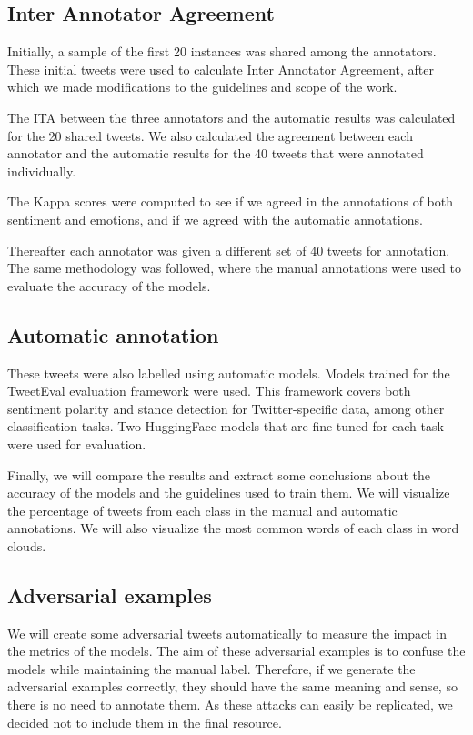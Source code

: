 \documentclass[11pt,a4paper]{article}
\begin{document}
\subsection{Inter Annotator Agreement}

Initially, a sample of the first 20 instances was shared among the annotators. These initial tweets were used to calculate Inter Annotator Agreement, after which we made modifications to the guidelines and scope of the work. 

The ITA between the three annotators and the automatic results was calculated for the 20 shared tweets. We also calculated the agreement between each annotator and the automatic results for the 40 tweets that were annotated individually.

The Kappa scores were computed to see if we agreed in the annotations of both sentiment and emotions, and if we agreed with the automatic annotations.

Thereafter each annotator was given a different set of 40 tweets for annotation. The same methodology was followed, where the manual annotations were used to evaluate the accuracy of the models.

\subsection{Automatic annotation}

These tweets were also labelled using automatic models. Models trained for the TweetEval \cite{barbieri-etal-2020-tweeteval} evaluation framework were used. This framework covers both sentiment polarity and stance detection for Twitter-specific data, among other classification tasks. Two HuggingFace models that are fine-tuned for each task were used for evaluation.

Finally, we will compare the results and extract some conclusions about the accuracy of the models and the guidelines used to train them. We will visualize the percentage of tweets from each class in the manual and automatic annotations. We will also visualize the most common words of each class in word clouds.

\subsection{Adversarial examples}

We will create some adversarial tweets automatically to measure the impact in the metrics of the models. The aim of these adversarial examples is to confuse the models while maintaining the manual label. Therefore, if we generate the adversarial examples correctly, they should have the same meaning and sense, so there is no need to annotate them. As these attacks can easily be replicated, we decided not to include them in the final resource.
\end{document}
